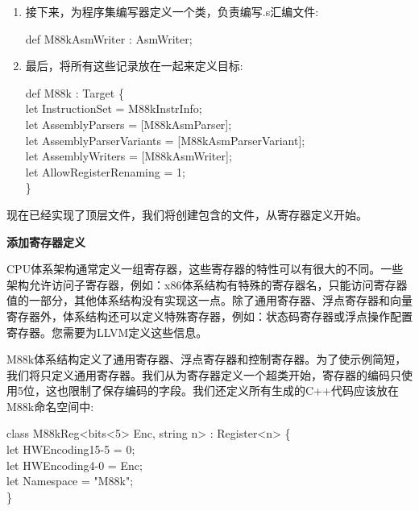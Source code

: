 \begin{enumerate}
\item 接下来，为程序集编写器定义一个类，负责编写.s汇编文件:
\begin{tcolorbox}[colback=white,colframe=black]
def M88kAsmWriter : AsmWriter;
\end{tcolorbox}

\item 最后，将所有这些记录放在一起来定义目标:
\begin{tcolorbox}[colback=white,colframe=black]
def M88k : Target \{ \\
\hspace*{1cm}let InstructionSet = M88kInstrInfo; \\
\hspace*{1cm}let AssemblyParsers = [M88kAsmParser]; \\
\hspace*{1cm}let AssemblyParserVariants = [M88kAsmParserVariant]; \\
\hspace*{1cm}let AssemblyWriters = [M88kAsmWriter]; \\
\hspace*{1cm}let AllowRegisterRenaming = 1; \\
\}
\end{tcolorbox}

\end{enumerate}

现在已经实现了顶层文件，我们将创建包含的文件，从寄存器定义开始。\par

\hspace*{\fill} \par %
\textbf{添加寄存器定义}

CPU体系架构通常定义一组寄存器，这些寄存器的特性可以有很大的不同。一些架构允许访问子寄存器，例如：x86体系结构有特殊的寄存器名，只能访问寄存器值的一部分，其他体系结构没有实现这一点。除了通用寄存器、浮点寄存器和向量寄存器外，体系结构还可以定义特殊寄存器，例如：状态码寄存器或浮点操作配置寄存器。您需要为LLVM定义这些信息。\par

M88k体系结构定义了通用寄存器、浮点寄存器和控制寄存器。为了使示例简短，我们将只定义通用寄存器。我们从为寄存器定义一个超类开始，寄存器的编码只使用5位，这也限制了保存编码的字段。我们还定义所有生成的C++代码应该放在M88k命名空间中:\par

\begin{tcolorbox}[colback=white,colframe=black]
class M88kReg<bits<5> Enc, string n> : Register<n> \{ \\
\hspace*{1cm}let HWEncoding{15-5} = 0; \\
\hspace*{1cm}let HWEncoding{4-0} = Enc; \\
\hspace*{1cm}let Namespace = "M88k"; \\
\}
\end{tcolorbox}

